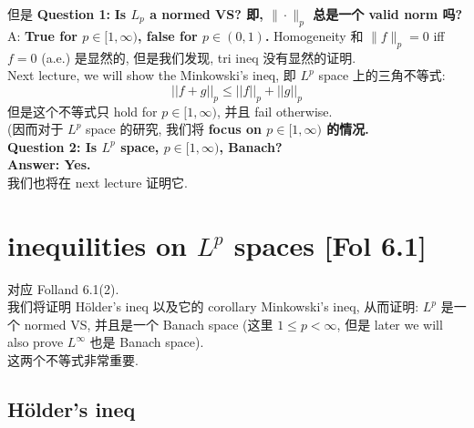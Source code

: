 \documentclass[lang=cn,11pt]{elegantbook}
\begin{document}
但是 \textbf{Question 1: }\textbf{Is $L_p$ a normed VS? 即, $\| \cdot\|_p$ 总是一个 valid norm 吗?}
A: \textbf{True for $p\in [1,\infty)$, false for $p\in (0,1)$.} 
Homogeneity 和 $\|f\|_p = 0$ iff $f = 0$ (a.e.) 是显然的, 但是我们发现, tri ineq 没有显然的证明.\\
Next lecture, we will show the Minkowski's ineq, 即 $L^p$ space 上的三角不等式:
\[
||f + g||_p \leq ||f||_p + ||g||_p
\]
但是这个不等式只 hold for $p\in [1,\infty)$, 并且 fail otherwise.\\
(因而对于 $L^p$ space 的研究, 我们将 \textbf{focus on $p \in [1,\infty)$ 的情况.}\\

\textbf{Question 2: Is $L^p$ space, $p\in [1,\infty)$, Banach?\\
Answer: Yes.}\\
我们也将在 next lecture 证明它.




\chapter{inequilities on $L^p$ spaces [Fol 6.1]}
对应 Folland 6.1(2).\\
我们将证明 Hölder's ineq 以及它的 corollary Minkowski's ineq, 从而证明: $L^p$ 是一个 normed VS, 并且是一个 Banach space (这里 $1\leq p <\infty$, 但是 later we will also prove $L^\infty$ 也是 Banach space).\\
这两个不等式非常重要.

\section{Hölder's ineq}
\end{document}
